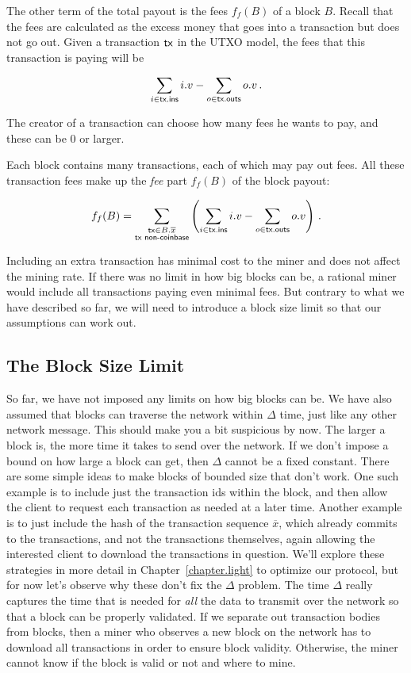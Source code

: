 The other term of the total payout is the fees $f_f(B)$ of a block $B$.
Recall that the fees are calculated as the excess money that goes into
a transaction but does not go out. Given a transaction $\mathsf{tx}$ in the UTXO
model, the fees that this transaction is paying will be

\[
   \sum_{i \in \mathsf{tx}\textsf{.ins}} i.v - \sum_{o \in \mathsf{tx}\textsf{.outs}} o.v\,.
\]

The creator of a transaction can choose how many fees he wants to pay,
and these can be $0$ or larger.

Each block contains many transactions, each of which may pay out fees. All
these transaction fees make up the \emph{fee} part $f_f(B)$ of the block payout:

\[
  f_f(B) = \sum_{\substack{\mathsf{tx} \in B.\overline{x}\\\mathsf{tx} \textsf{ non-coinbase}}}
           \left(\sum_{i \in \mathsf{tx}\textsf{.ins}} i.v - \sum_{o \in \mathsf{tx}\textsf{.outs}} o.v\right)\,.
\]

Including an extra transaction has minimal cost to the miner and does not affect the mining
rate. If there was no limit in how big blocks can be, a rational miner would include all
transactions paying even minimal fees. But contrary to what we have described so far,
we will need to introduce a block size limit so that our assumptions can work out.

\subsection*{The Block Size Limit}

So far, we have not imposed any limits on how big blocks can be. We have also assumed
that blocks can traverse the network within $\Delta$ time, just like any other network message.
This should make you a bit suspicious by now. The larger a block is, the more time it
takes to send over the network. If we don't impose a bound on how large a block can get,
then $\Delta$ cannot be a fixed constant. There are some simple ideas to make blocks of
bounded size that don't work. One such example is to include just the transaction ids
within the block, and then allow the client to request each transaction as needed at
a later time. Another example is to just include the hash of the transaction sequence
$\overline{x}$, which already commits to the transactions, and not the transactions
themselves, again allowing the interested client to download the transactions in question.
We'll explore these strategies in more detail in Chapter~\ref{chapter.light} to optimize
our protocol, but for now let's observe why these don't fix the $\Delta$ problem.
The time $\Delta$ really captures the time that is needed for \emph{all} the data
to transmit over the network so that a block can be properly validated. If we separate
out transaction bodies from blocks, then a miner who observes a new block on the network
has to download all transactions in order to ensure block validity. Otherwise, the
miner cannot know if the block is valid or not and where to mine.


